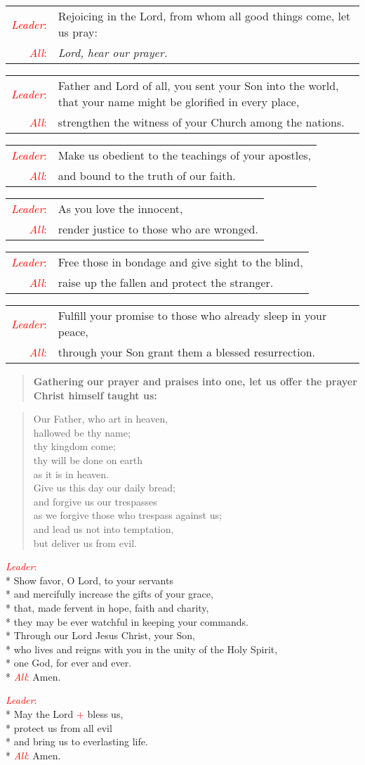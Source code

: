 \documentclass[letterpaper,14pt]{extarticle}
\newcommand{\side}[1]{\flagverse{\textcolor{red}{\textit{#1}}:}}
\newcommand{\sidestar}[1]{\textcolor{red}{\textit{#1}:}}
\newcommand{\rednote}[1]{\textcolor{red}{#1}}
\newlength{\oldindent}
\newcommand{\antiphon}[2]{
	\setlength{\oldindent}{\vindent}
	\setlength{\vindent}{0em}
	\begin{verse}
	\side{#1} \textbf{#2}
	\end{verse}
	\setlength{\vindent}{\oldindent}
}
\newcommand{\intercession}[2]{
	\begin{tabular}[h]{r p{4.25in}}
		\sidestar{Leader} & #1 \\
		\sidestar{All} & #2
	\end{tabular}}
\begin{document}
\intercession{Rejoicing in the Lord, from whom all good things come, let us pray:}
{\textit{Lord, hear our prayer.}}

\intercession{Father and Lord of all, you sent your Son into the world, that your name might be glorified in every place,}
{strengthen the witness of your Church among the nations.}

\intercession{Make us obedient to the teachings of your apostles,}
{and bound to the truth of our faith.}

\intercession{As you love the innocent,}
{render justice to those who are wronged.}

\intercession{Free those in bondage and give sight to the blind,}
{raise up the fallen and protect the stranger.}

\intercession{Fulfill your promise to those who already sleep in your peace,}
{through your Son grant them a blessed resurrection.}

\antiphon{Leader}{Gathering our prayer and praises into one, let us offer the
prayer Christ himself taught us:}
\begin{verse}
\side{All} Our Father, who art in heaven, \\
hallowed be thy name; \\
thy kingdom come; \\
thy will be done on earth \\
as it is in heaven. \\
Give us this day our daily bread; \\
and forgive us our trespasses \\
as we forgive those who trespass against us; \\
and lead us not into temptation, \\
but deliver us from evil.
\end{verse}

\sidestar{Leader}\\*
Show favor, O Lord, to your servants \\*
and mercifully increase the gifts of your grace, \\*
that, made fervent in hope, faith and charity, \\*
they may be ever watchful in keeping your commands. \\*
Through our Lord Jesus Christ, your Son, \\*
who lives and reigns with you in the unity of the Holy Spirit, \\*
one God, for ever and ever. \\*
\sidestar{All} Amen.


\sidestar{Leader}\\*
May the Lord \rednote{+} bless us, \\*
protect us from all evil \\*
and bring us to everlasting life. \\*
\sidestar{All} Amen.
\end{document}
